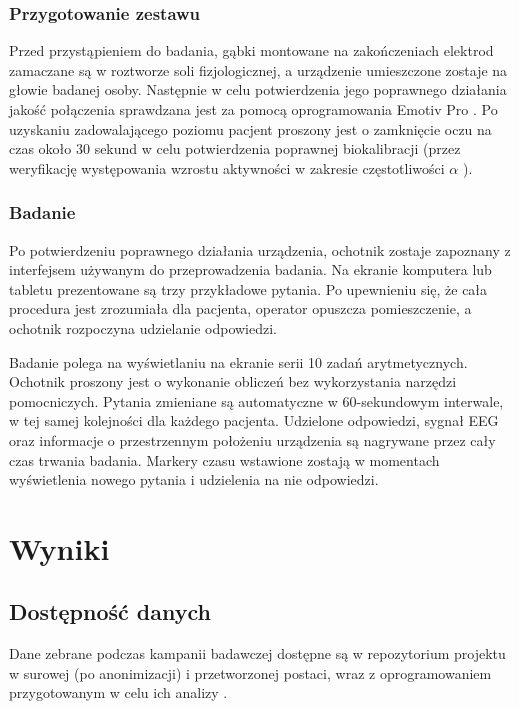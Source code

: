 \documentclass{./assets/wfis}
\begin{document}
\subsection{Przygotowanie zestawu}
Przed przystąpieniem do badania, gąbki montowane na zakończeniach elektrod zamaczane są w roztworze soli fizjologicznej, a urządzenie umieszczone zostaje na głowie badanej osoby. Następnie w celu potwierdzenia jego poprawnego działania jakość połączenia sprawdzana jest za pomocą oprogramowania Emotiv Pro \cite{emotiv_inc_epoc_nodate}. Po uzyskaniu zadowalającego poziomu pacjent proszony jest o zamknięcie oczu na czas około 30 sekund w celu potwierdzenia poprawnej biokalibracji (przez weryfikację występowania wzrostu aktywności w zakresie częstotliwości $\alpha$ \cite{britton_electroencephalography_2016}).

\subsection{Badanie}
Po potwierdzeniu poprawnego działania urządzenia, ochotnik zostaje zapoznany z interfejsem używanym do przeprowadzenia badania. Na ekranie komputera lub tabletu prezentowane są trzy przykładowe pytania. Po upewnieniu się, że cała procedura jest zrozumiała dla pacjenta, operator opuszcza pomieszczenie, a ochotnik rozpoczyna udzielanie odpowiedzi.

Badanie polega na wyświetlaniu na ekranie  serii 10 zadań arytmetycznych. Ochotnik proszony jest o wykonanie obliczeń bez wykorzystania narzędzi pomocniczych. Pytania zmieniane są automatyczne w 60-sekundowym interwale, w tej samej kolejności dla każdego pacjenta. Udzielone odpowiedzi, sygnał EEG oraz informacje o przestrzennym położeniu urządzenia są nagrywane przez cały czas trwania badania. Markery czasu wstawione zostają w momentach wyświetlenia nowego pytania i udzielenia na nie odpowiedzi.


\chapter{Wyniki}
\section{Dostępność danych}
Dane zebrane podczas kampanii badawczej dostępne są w repozytorium projektu w surowej (po anonimizacji) i przetworzonej postaci, wraz z oprogramowaniem przygotowanym w celu ich analizy  \cite{mateusz_kojro_mateuszkojrobachelors-thesis_nodate}. 
\end{document}
